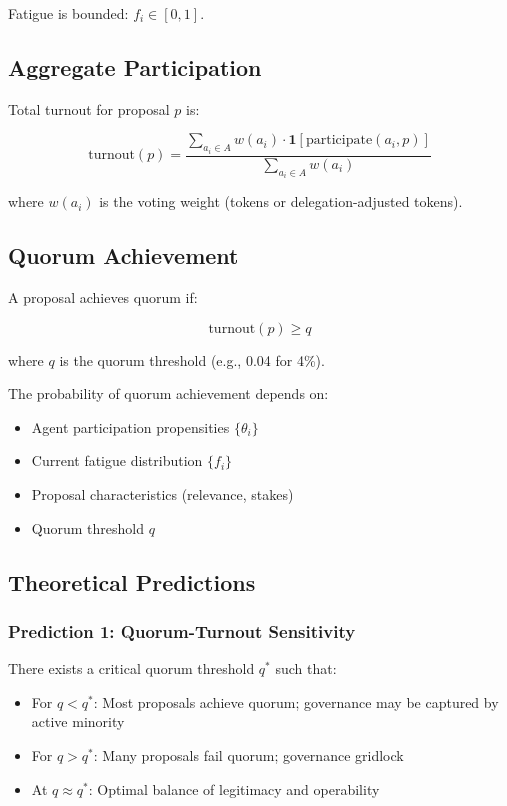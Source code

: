 Fatigue is bounded: $f_i \in [0, 1]$.

\subsection{Aggregate Participation}

Total turnout for proposal $p$ is:

\begin{equation}
\text{turnout}(p) = \frac{\sum_{a_i \in A} w(a_i) \cdot \mathbf{1}[\text{participate}(a_i, p)]}{\sum_{a_i \in A} w(a_i)}
\end{equation}

where $w(a_i)$ is the voting weight (tokens or delegation-adjusted tokens).

\subsection{Quorum Achievement}

A proposal achieves quorum if:

\begin{equation}
\text{turnout}(p) \geq q
\end{equation}

where $q$ is the quorum threshold (e.g., 0.04 for 4\%).

The probability of quorum achievement depends on:
\begin{itemize}
    \item Agent participation propensities $\{\theta_i\}$
    \item Current fatigue distribution $\{f_i\}$
    \item Proposal characteristics (relevance, stakes)
    \item Quorum threshold $q$
\end{itemize}

\subsection{Theoretical Predictions}

\subsubsection{Prediction 1: Quorum-Turnout Sensitivity}

There exists a critical quorum threshold $q^*$ such that:
\begin{itemize}
    \item For $q < q^*$: Most proposals achieve quorum; governance may be captured by active minority
    \item For $q > q^*$: Many proposals fail quorum; governance gridlock
    \item At $q \approx q^*$: Optimal balance of legitimacy and operability
\end{itemize}

